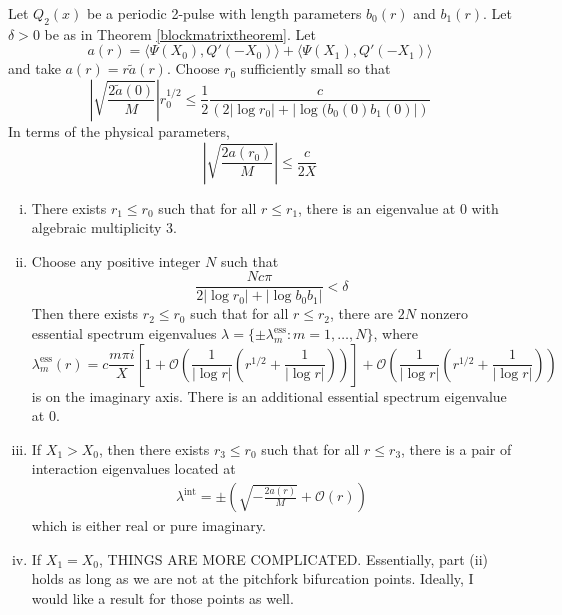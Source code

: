 \documentclass[thesis.tex]{subfiles}
\begin{document}
\begin{theorem}\label{theorem:2peigscase1}
Let $Q_2(x)$ be a periodic 2-pulse with length parameters $b_0(r)$ and $b_1(r)$. Let $\delta > 0$ be as in Theorem \ref{blockmatrixtheorem}. Let
\begin{equation}
a(r) = \langle \Psi(X_0), Q'(-X_0) \rangle + \langle \Psi(X_1), Q'(-X_1) \rangle
\end{equation}
and take $a(r) = r \tilde{a}(r)$. Choose $r_0$ sufficiently small so that 
\begin{equation}\label{nobubblecond}
\left| \sqrt{\frac{2 \tilde{a}(0)}{M}}\right|r_0^{1/2} \leq \frac{1}{2} \frac{c}{\left( 2 |\log r_0| + |\log( b_0(0) b_1(0) |\right)}
\end{equation}
In terms of the physical parameters, 
\[
\left| \sqrt{\frac{2a(r_0)}{M}} \right| \leq \frac{c}{2 X}
\]

\begin{enumerate}[(i)]
\item There exists $r_1 \leq r_0$ such that for all $r \leq r_1$, there is an eigenvalue at 0 with algebraic multiplicity 3.
\item Choose any positive integer $N$ such that
\[
\frac{N c \pi}{2 |\log r_0| + |\log b_0 b_1| } < \delta
\]
Then there exists $r_2 \leq r_0$ such that for all $r\leq r_2$, there are $2N$ nonzero essential spectrum eigenvalues $\lambda = \{ \pm \lambda_m^{\text{ess}} : m = 1, \dots, N\}$, where
\[
\lambda_m^{\text{ess}}(r) = c \frac{m \pi i}{X}\left[1 + \mathcal{O}\left( \frac{1}{|\log r|}\left( r^{1/2} + \frac{1}{|\log r|} \right) \right) \right] + \mathcal{O}\left( \frac{1}{|\log r|}\left( r^{1/2} + \frac{1}{|\log r|} \right) \right)
\]
is on the imaginary axis. There is an additional essential spectrum eigenvalue at 0.

\item If $X_1 > X_0$, then there exists $r_3 \leq r_0$ such that for all $r \leq r_3$, there is a pair of interaction eigenvalues located at
\begin{align*}
\lambda^{\text{int}} = \pm \left( \sqrt{-\frac{2 a(r)}{M}} + \mathcal{O}( r ) \right)
\end{align*}
which is either real or pure imaginary.

\item If $X_1 = X_0$, THINGS ARE MORE COMPLICATED. Essentially, part (ii) holds as long as we are not at the pitchfork bifurcation points. Ideally, I would like a result for those points as well.

\end{enumerate}
\end{theorem}
\end{document}
